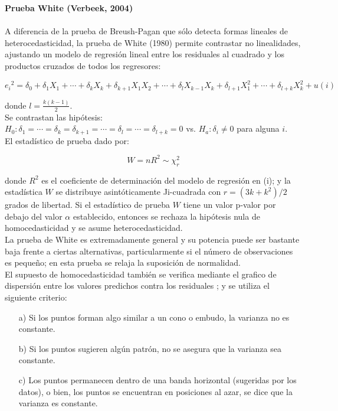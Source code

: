 \textbf{Prueba White (Verbeek, 2004)}\\\\
A diferencia de la prueba de Breush-Pagan que sólo detecta formas lineales de heterocedasticidad, la prueba de White (1980) permite contrastar no linealidades, ajustando un modelo de regresión lineal entre los residuales al cuadrado y los productos cruzados de todos los regresores:


\begin{center}
	$${e_i} ^2=\delta _0 + \delta _1 X_1+ \cdots + \delta _{k} X_k + \delta _{k+1} X_1 X_2+ \cdots +\delta _l X_{k-1} X_k+  \delta _{l+1} X_1 ^2 + \cdots  + \delta _{l+k} X_k ^2 + u(i)$$
\end{center}


donde  $l=\frac{k(k-1)}{2}$.\\
Se contrastan las hipótesis:\\
$H_0: \delta _1 =  \cdots =\delta _k=\delta _{k+1} =  \cdots =\delta _l= \cdots=\delta_{l+k} =0 $  vs.  $H_a: \delta_i \neq 0$ para alguna $i$.\\

El estadístico de prueba dado por:

\begin{center}
	$$W=n R^2 \sim \chi_r ^2$$
\end{center}


donde $R^2$ es el coeficiente de determinación del modelo de regresión en (i); y la estadística $W$ se distribuye asintóticamente Ji-cuadrada con $r=(3k + k^2)/2$ grados de libertad. Si el estadístico de prueba $W$  tiene un valor p-valor por debajo del valor $\alpha$ establecido, entonces se rechaza la hipótesis nula de homocedasticidad y se asume heterocedasticidad.\\


La prueba de White es extremadamente general y su potencia puede ser bastante baja frente a ciertas alternativas, particularmente si el número de observaciones es pequeño; en esta prueba se relaja la suposición de normalidad. \\
El supuesto de homocedasticidad también se verifica mediante el grafico de dispersión entre los valores predichos  contra los residuales ; y se utiliza el siguiente criterio:\\

\begin{itemize}
	\item[a)] Si los puntos forman algo similar a un cono o embudo, la varianza no es constante.
	
	\item[b)] Si los puntos sugieren algún patrón, no se asegura que la varianza sea constante.
	
	\item[c)] Los puntos permanecen dentro de una banda horizontal (sugeridas por los datos), o bien, los puntos se encuentran en posiciones al azar, se dice que la varianza es constante. 
\end{itemize}



